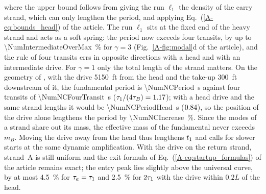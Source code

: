 where the upper bound follows from giving the run $\ell_1$ the density of the carry strand,
which can only lengthen the period, and applying Eq.~(\ref{A-eq:bounds_head}) of the article. The
run $\ell_1$ sits at the fixed end of the heavy strand and acts as a soft spring: the period now
exceeds four transits, by up to \qty{\NumIntermediateOverMax}{\percent} for $\gamma=3$
(Fig.~\ref{A-fig:modal}d of the article), and the rule of four transits errs in opposite
directions with a head and with an intermediate drive. For $\gamma=1$ only the total length of
the strand matters. On the geometry of \citet{nordell1984}, with the drive \qty{5150}{ft} from
the head and the take-up \qty{300}{ft} downstream of it, the fundamental period is
\qty{\NumNCPeriod}{\second} against four transits of \qty{\NumNCFourTransit}{\second}
($\tau_{1}/(4\tau_B)=1.17$); with a head drive and the same strand lengths it would be
\qty{\NumNCPeriodHead}{\second} ($0.84$), so the position of the drive alone
lengthens the period by \qty{\NumNCIncrease}{\percent}. Since the modes of a strand share out
its mass, the effective mass of the fundamental never exceeds $m_B$. Moving the drive away from
the head thus lengthens $t_{1}$ and calls for slower starts at the same dynamic amplification.
With the drive on the return strand, strand~A is still uniform and the exit formula of
Eq.~(\ref{A-eq:startup_formulas}) of the article remains exact; the entry peak lies slightly above
the universal curve, by at most \qty{4.5}{\percent} for $\tau_a=\tau_{1}$ and
\qty{2.5}{\percent} for $2\tau_{1}$ with the drive within $0.2L$ of the head.

